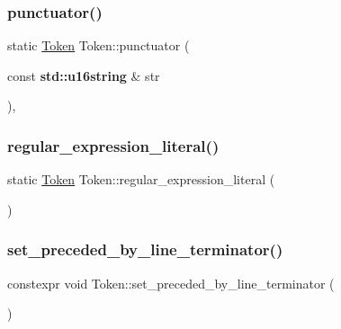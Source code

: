 \subsubsection{\texorpdfstring{punctuator()}{punctuator()}\hspace{0.1cm}{\footnotesize\ttfamily [3/3]}}
{\footnotesize\ttfamily static \hyperlink{class_token}{Token} Token\+::punctuator (\begin{DoxyParamCaption}\item[{const \textbf{ std\+::u16string} \&}]{str }\end{DoxyParamCaption})\hspace{0.3cm}{\ttfamily [inline]}, {\ttfamily [static]}}

\mbox{\label{class_token_a6309eea1bba53663cbf2b3fc1fdb3b08}} 
\subsubsection{\texorpdfstring{regular\+\_\+expression\+\_\+literal()}{regular\_expression\_literal()}}
{\footnotesize\ttfamily static \hyperlink{class_token}{Token} Token\+::regular\+\_\+expression\+\_\+literal (\begin{DoxyParamCaption}{ }\end{DoxyParamCaption})\hspace{0.3cm}{\ttfamily [static]}}

\mbox{\label{class_token_a1a3247e7cb73b8f7a5f03517163275e7}} 
\subsubsection{\texorpdfstring{set\+\_\+preceded\+\_\+by\+\_\+line\+\_\+terminator()}{set\_preceded\_by\_line\_terminator()}}
{\footnotesize\ttfamily constexpr void Token\+::set\+\_\+preceded\+\_\+by\+\_\+line\+\_\+terminator (\begin{DoxyParamCaption}{ }\end{DoxyParamCaption})\hspace{0.3cm}{\ttfamily [inline]}}

